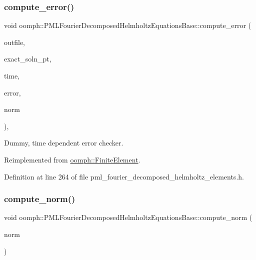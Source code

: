 \subsubsection{\texorpdfstring{compute\+\_\+error()}{compute\_error()}\hspace{0.1cm}{\footnotesize\ttfamily [2/2]}}
{\footnotesize\ttfamily void oomph\+::\+P\+M\+L\+Fourier\+Decomposed\+Helmholtz\+Equations\+Base\+::compute\+\_\+error (\begin{DoxyParamCaption}\item[{std\+::ostream \&}]{outfile,  }\item[{\hyperlink{classoomph_1_1FiniteElement_ad4ecf2b61b158a4b4d351a60d23c633e}{Finite\+Element\+::\+Unsteady\+Exact\+Solution\+Fct\+Pt}}]{exact\+\_\+soln\+\_\+pt,  }\item[{const double \&}]{time,  }\item[{double \&}]{error,  }\item[{double \&}]{norm }\end{DoxyParamCaption})\hspace{0.3cm}{\ttfamily [inline]}, {\ttfamily [virtual]}}



Dummy, time dependent error checker. 



Reimplemented from \hyperlink{classoomph_1_1FiniteElement_a7f67853506dc73fa6b7505108de22d1f}{oomph\+::\+Finite\+Element}.



Definition at line 264 of file pml\+\_\+fourier\+\_\+decomposed\+\_\+helmholtz\+\_\+elements.\+h.

\mbox{\label{classoomph_1_1PMLFourierDecomposedHelmholtzEquationsBase_a74c7136878535e68ba828d9c55b74173}} 
\subsubsection{\texorpdfstring{compute\+\_\+norm()}{compute\_norm()}}
{\footnotesize\ttfamily void oomph\+::\+P\+M\+L\+Fourier\+Decomposed\+Helmholtz\+Equations\+Base\+::compute\+\_\+norm (\begin{DoxyParamCaption}\item[{double \&}]{norm }\end{DoxyParamCaption})\hspace{0.3cm}{\ttfamily [virtual]}}



